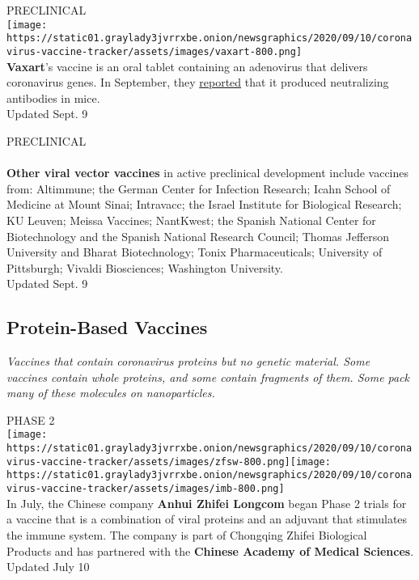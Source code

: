PRECLINICAL\\
\texttt{[image: https://static01.graylady3jvrrxbe.onion/newsgraphics/2020/09/10/coronavirus-vaccine-tracker/assets/images/vaxart-800.png]}\\
\textbf{\textbf{Vaxart}}'s vaccine is an oral tablet containing an
adenovirus that delivers coronavirus genes. In September, they
\href{https://www.biorxiv.org/content/10.1101/2020.09.04.283853v1}{reported}
that it produced neutralizing antibodies in mice.\\
Updated Sept. 9

PRECLINICAL\\
~\\
 \textbf{\textbf{Other viral vector vaccines}} in active preclinical
development include vaccines from: Altimmune; the German Center for
Infection Research; Icahn School of Medicine at Mount Sinai; Intravacc;
the Israel Institute for Biological Research; KU Leuven; Meissa
Vaccines; NantKwest; the Spanish National Center for Biotechnology and
the Spanish National Research Council; Thomas Jefferson University and
Bharat Biotechnology; Tonix Pharmaceuticals; University of Pittsburgh;
Vivaldi Biosciences; Washington University.\\
Updated Sept. 9

\hypertarget{protein-based-vaccines}{%
\subsection{\texorpdfstring{\textbf{Protein-Based
Vaccines}}{Protein-Based Vaccines}}\label{protein-based-vaccines}}

\emph{Vaccines that contain coronavirus proteins but no genetic
material. Some vaccines contain whole proteins, and some contain
fragments of them. Some pack many of these molecules on nanoparticles.}

PHASE 2\\
\texttt{[image: https://static01.graylady3jvrrxbe.onion/newsgraphics/2020/09/10/coronavirus-vaccine-tracker/assets/images/zfsw-800.png]}\texttt{[image: https://static01.graylady3jvrrxbe.onion/newsgraphics/2020/09/10/coronavirus-vaccine-tracker/assets/images/imb-800.png]}\\
In July, the Chinese company \textbf{\textbf{Anhui Zhifei Longcom}}
began Phase 2 trials for a vaccine that is a combination of viral
proteins and an adjuvant that stimulates the immune system. The company
is part of Chongqing Zhifei Biological Products and has partnered with
the \textbf{\textbf{Chinese Academy of Medical Sciences}}.\\
Updated July 10

